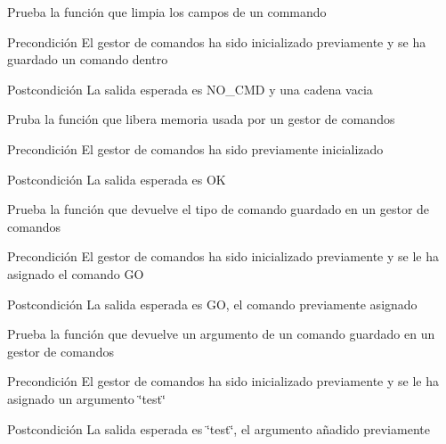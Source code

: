 
\begin{DoxyRefList}
\item[\label{test__test000019}%
\hypertarget{test__test000019}{}%
Global \hyperlink{command__test_8c_a236c05756c05095a18d072c510b83d03}{test1\-\_\-command\-\_\-clear} ()]Prueba la función que limpia los campos de un commando \begin{DoxyPrecond}{Precondición}
El gestor de comandos ha sido inicializado previamente y se ha guardado un comando dentro 
\end{DoxyPrecond}
\begin{DoxyPostcond}{Postcondición}
La salida esperada es N\-O\-\_\-\-C\-M\-D y una cadena vacia  
\end{DoxyPostcond}

\item[\label{test__test000004}%
\hypertarget{test__test000004}{}%
Global \hyperlink{command__test_8c_aadf731a98e5122e70ede7cdc68ba621f}{test1\-\_\-command\-\_\-destroy} ()]Pruba la función que libera memoria usada por un gestor de comandos \begin{DoxyPrecond}{Precondición}
El gestor de comandos ha sido previamente inicializado 
\end{DoxyPrecond}
\begin{DoxyPostcond}{Postcondición}
La salida esperada es O\-K  
\end{DoxyPostcond}

\item[\label{test__test000013}%
\hypertarget{test__test000013}{}%
Global \hyperlink{command__test_8c_a816316ae397e657bbc52b5b1090d1120}{test1\-\_\-command\-\_\-get\-\_\-cmd} ()]Prueba la función que devuelve el tipo de comando guardado en un gestor de comandos \begin{DoxyPrecond}{Precondición}
El gestor de comandos ha sido inicializado previamente y se le ha asignado el comando G\-O 
\end{DoxyPrecond}
\begin{DoxyPostcond}{Postcondición}
La salida esperada es G\-O, el comando previamente asignado  
\end{DoxyPostcond}

\item[\label{test__test000016}%
\hypertarget{test__test000016}{}%
Global \hyperlink{command__test_8c_afd67efd435f709512037b86c40a264ed}{test1\-\_\-command\-\_\-get\-\_\-cmd\-\_\-arg} ()]Prueba la función que devuelve un argumento de un comando guardado en un gestor de comandos \begin{DoxyPrecond}{Precondición}
El gestor de comandos ha sido inicializado previamente y se le ha asignado un argumento \char`\"{}test\char`\"{} 
\end{DoxyPrecond}
\begin{DoxyPostcond}{Postcondición}
La salida esperada es \char`\"{}test\char`\"{}, el argumento añadido previamente  
\end{DoxyPostcond}


\end{DoxyRefList}
